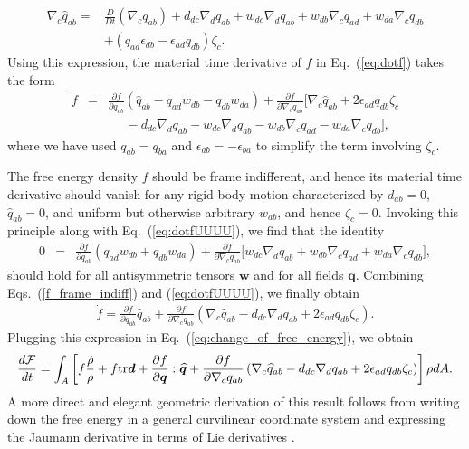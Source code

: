 \documentclass[12pt]{iopart}
\begin{document}
	\begin{eqnarray}
		\nabla_c \widehat{q}_{ab} = &  \frac{D}{Dt} \left(\nabla_c q_{ab}\right) + d_{dc} \nabla_d q_{ab} + w_{dc} \nabla_d q_{ab}  +  w_{db} \nabla_c q_{ad} + w_{da} \nabla_c q_{db}  \nonumber \\ & +  \left(q_{ad}\epsilon_{db}   - \epsilon_{ad} q_{db} \right)\zeta_c.
	\end{eqnarray}
	Using this expression, the material time derivative of $f$ in Eq.~(\ref{eq:dotf}) takes the form
	\begin{eqnarray} 
		\dot{f} &= &  \frac{\partial f}{\partial q_{ab}} \left(\widehat{q}_{ab}- q_{ad} w_{db}- q_{db} w_{da}\right)   + \frac{\partial f}{\partial \nabla_c q_{ab}} \bigg[ \nabla_c \widehat{q}_{ab} +  2\epsilon_{ad} q_{db}   \zeta_c \nonumber\\ && \;\;\;\;\; - d_{dc} \nabla_d q_{ab}  - w_{dc} \nabla_d q_{ab}  -  w_{db} \nabla_c q_{ad} - w_{da} \nabla_c q_{db}  \bigg], \label{eq:dotfUUUU}  
	\end{eqnarray}
	where we have used ${q}_{ab} = {q}_{ba}$ and ${\epsilon}_{ab} = -{\epsilon}_{ba}$ to simplify the term involving $\zeta_c$.
	
	The free energy density $f$ should be frame indifferent, and hence its material time derivative should vanish for any rigid body motion characterized by  $d_{ab}=0$, $\widehat{q}_{ab}=0$, and uniform but otherwise arbitrary $w_{ab}$, and hence $\zeta_c = 0$. Invoking this principle along with  Eq.~(\ref{eq:dotfUUUU}), we find that the identity
	\begin{eqnarray} 
		0 &= & \frac{\partial f}{\partial q_{ab}} \left(  q_{ad} w_{db}+ q_{db} w_{da}\right)  + \frac{\partial f}{\partial \nabla_c q_{ab}} \bigg[   w_{dc} \nabla_d q_{ab}  +  w_{db} \nabla_c q_{ad} + w_{da} \nabla_c q_{db}  \bigg],
		\label{f_frame_indiff}
	\end{eqnarray}
	should hold for all antisymmetric tensors $\bm{w}$ and for all fields $\bm{q}$. Combining Eqs.~(\ref{f_frame_indiff}) and (\ref{eq:dotfUUUU}), we finally obtain 
	\begin{eqnarray}
		\dot{f} = \frac{\partial f}{\partial q_{ab}}\widehat{q}_{ab} + \frac{\partial f}{\partial \nabla_c q_{ab}}\left( \nabla_c \widehat{q}_{ab} - d_{dc} \nabla_d q_{ab} + 2\epsilon_{ad} q_{db}  \zeta_c\right).
		\label{eq:final_rate_of_free_energy}
	\end{eqnarray}
	Plugging this expression in Eq.~(\ref{eq:change_of_free_energy}), we obtain
	\begin{eqnarray} 
		\frac{d{\mathcal{F}}}{dt} =  \int_{A}  \left[  f\frac{\dot{\rho}}{\rho}  + f  {\rm tr}\bm{d} +\frac{\partial  f}{\partial \bm{q}} : \widehat{\bm{q}}  + \frac{\partial f}{\partial \nabla_c q_{ab}}\left( \nabla_c \widehat{q}_{ab} - d_{dc} \nabla_d q_{ab} + 2\epsilon_{ad} q_{db}  \zeta_c\right) \right] \rho dA.\label{eq:dotF}
	\end{eqnarray}
	A more direct and elegant geometric derivation of this result follows from writing down the free energy in a general curvilinear coordinate system and expressing the Jaumann derivative in terms of Lie derivatives \cite{mirza2023,waleed_thesis}.
	
\end{document}
